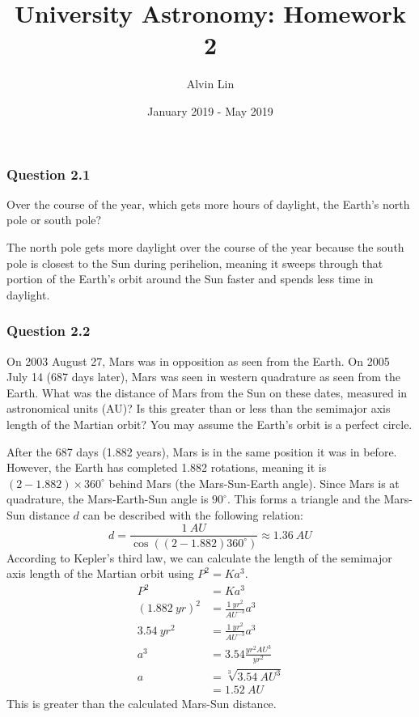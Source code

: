 \documentclass{math}
\title{University Astronomy: Homework 2}
\author{Alvin Lin}
\date{January 2019 - May 2019}
\begin{document}
\maketitle

\subsubsection*{Question 2.1}
Over the course of the year, which gets more hours of daylight, the Earth's
north pole or south pole? \par
The north pole gets more daylight over the course of the year because the south
pole is closest to the Sun during perihelion, meaning it sweeps through that
portion of the Earth's orbit around the Sun faster and spends less time in
daylight.

\subsubsection*{Question 2.2}
On 2003 August 27, Mars was in opposition as seen from the Earth. On 2005 July
14 (687 days later), Mars was seen in western quadrature as seen from the Earth.
What was the distance of Mars from the Sun on these dates, measured in
astronomical units (AU)? Is this greater than or less than the semimajor axis
length of the Martian orbit? You may assume the Earth's orbit is a perfect
circle. \par
After the 687 days (1.882 years), Mars is in the same position it was in before.
However, the Earth has completed 1.882 rotations, meaning it is
\( (2-1.882)\times360^{\circ} \) behind Mars (the Mars-Sun-Earth angle). Since
Mars is at quadrature, the Mars-Earth-Sun angle is \( 90^{\circ} \). This forms
a triangle and the Mars-Sun distance \( d \) can be described with the following
relation:
\[ d = \frac{1~AU}{\cos((2-1.882)360^{\circ})} \approx 1.36~AU \]
According to Kepler's third law, we can calculate the length of the semimajor
axis length of the Martian orbit using \( P^2 = Ka^3 \).
\begin{align*}
  P^2 &= Ka^3 \\
  (1.882~yr)^2 &= \frac{1~yr^2}{AU^{-3}}a^3 \\
  3.54~yr^2 &= \frac{1~yr^2}{AU^{-3}}a^3 \\
  a^3 &= 3.54\frac{yr^2AU^3}{yr^2} \\
  a &= \sqrt[3]{3.54~AU^3} \\
  &= 1.52~AU
\end{align*}
This is greater than the calculated Mars-Sun distance.
\end{document}
